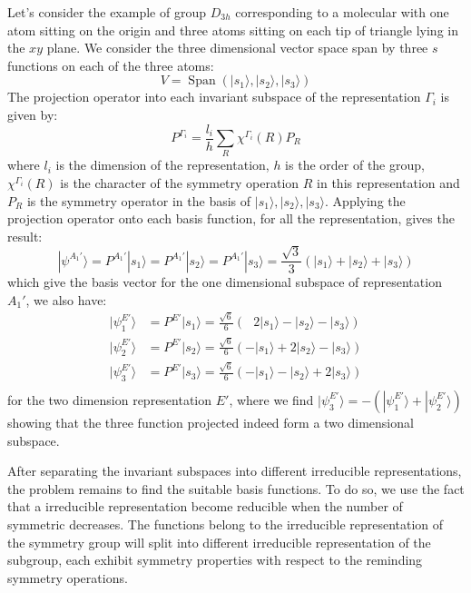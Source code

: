 \documentclass{article}
\DeclareMathOperator{\spn}{Span}
\begin{document}
Let's consider the example of group $D_{3h}$ corresponding to a molecular with one atom sitting 
on the origin and three atoms sitting on each tip of triangle lying in the $xy$ plane. We consider 
the three dimensional vector space span by three $s$ functions on each of the three atoms:
\begin{equation}
    V = \spn(|s_1\rangle, |s_2\rangle, |s_3\rangle)
\end{equation}
The projection operator into each invariant subspace of the representation $\Gamma_i$ is given by:
\begin{equation}
    P^{\Gamma_i} = \frac{l_i}{h} \sum_R \chi^{\Gamma_i}(R) P_R
\end{equation}
where $l_i$ is the dimension of the representation, $h$ is the order of the group, 
$\chi^{\Gamma_i}(R)$ is the character of the symmetry operation $R$ in this representation 
and $P_R$ is the symmetry operator in the basis of $|s_1\rangle, |s_2\rangle, |s_3\rangle$. 
Applying the projection operator onto each basis function, for all the representation, 
gives the result:
\begin{equation}
    | \psi^{A_1'} \rangle = P^{A_1'}|s_1\rangle = P^{A_1'}|s_2\rangle = P^{A_1'}|s_3\rangle 
    = \frac{\sqrt{3}}{3} (|s_1\rangle + |s_2\rangle + |s_3\rangle)
\end{equation}
which give the basis vector for the one dimensional subspace of representation $A_1'$, 
we also have:
\begin{align}
    |\psi_1^{E'}\rangle &= P^{E'} | s_1 \rangle = \frac{\sqrt{6}}{6}(\ \ \ 2|s_1\rangle - |s_2\rangle - |s_3\rangle) \\
    |\psi_2^{E'}\rangle &= P^{E'} | s_2 \rangle = \frac{\sqrt{6}}{6}(- |s_1\rangle + 2|s_2\rangle - |s_3\rangle) \\
    |\psi_3^{E'}\rangle &= P^{E'} | s_3 \rangle = \frac{\sqrt{6}}{6}(- |s_1\rangle - |s_2\rangle + 2 |s_3\rangle) \\
\end{align}
for the two dimension representation $E'$, where we find $|\psi_3^{E'}\rangle = - (|\psi_1^{E'}\rangle + |\psi_2^{E'}\rangle)$
showing that the three function projected indeed form a two dimensional subspace. 

After separating the invariant subspaces into different irreducible representations, the problem remains to 
find the suitable basis functions. 
To do so, we use the fact that a irreducible representation become 
reducible when the number of symmetric decreases. 
The functions belong to the irreducible representation of the symmetry group will split into different 
irreducible representation of the subgroup, each exhibit symmetry properties with respect to the reminding 
symmetry operations. 
\end{document}

